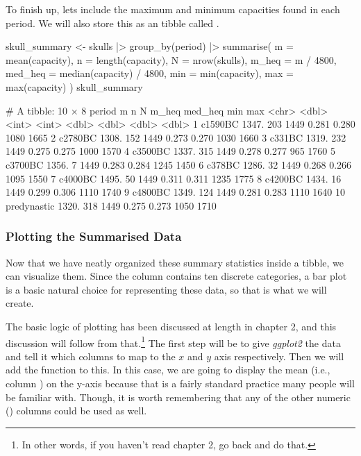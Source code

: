 To finish up, lets include the maximum and minimum capacities found in each period. We will also store this as an tibble called .

\begin{inR}
skull_summary <- skulls |>
  group_by(period) |>
  summarise(
    m = mean(capacity),
    n = length(capacity),
    N = nrow(skulls),
    m_heq = m / 4800,
    med_heq = median(capacity) / 4800,
    min = min(capacity),
    max = max(capacity)
  )
skull_summary
\end{inR}

\clearpage

\begin{outR}
# A tibble: 10 × 8
   period          m     n     N m_heq med_heq   min   max
   <chr>       <dbl> <int> <int> <dbl>   <dbl> <dbl> <dbl>
 1 c1590BC     1347.   203  1449 0.281   0.280  1080  1665
 2 c2780BC     1308.   152  1449 0.273   0.270  1030  1660
 3 c331BC      1319.   232  1449 0.275   0.275  1000  1570
 4 c3500BC     1337.   315  1449 0.278   0.277   965  1760
 5 c3700BC     1356.     7  1449 0.283   0.284  1245  1450
 6 c378BC      1286.    32  1449 0.268   0.266  1095  1550
 7 c4000BC     1495.    50  1449 0.311   0.311  1235  1775
 8 c4200BC     1434.    16  1449 0.299   0.306  1110  1740
 9 c4800BC     1349.   124  1449 0.281   0.283  1110  1640
10 predynastic 1320.   318  1449 0.275   0.273  1050  1710
\end{outR}

\subsubsection{Plotting the Summarised Data}

Now that we have neatly organized these summary statistics inside a tibble, we can visualize them. Since the  column contains ten discrete categories, a bar plot is a basic natural choice for representing these data, so that is what we will create.

The basic logic of plotting has been discussed at length in chapter 2, and this discussion will follow from that.\footnote{In other words, if you haven't read chapter 2, go back and do that.} The first step will be to give \textit{ggplot2} the data and tell it which columns to map to the $x$ and $y$ axis respectively. Then we will add the  function to this. In this case, we are going to display the mean (i.e., column ) on the y-axis because that is a fairly standard practice many people will be familiar with. Though, it is worth remembering that any of the other numeric () columns could be used as well.

